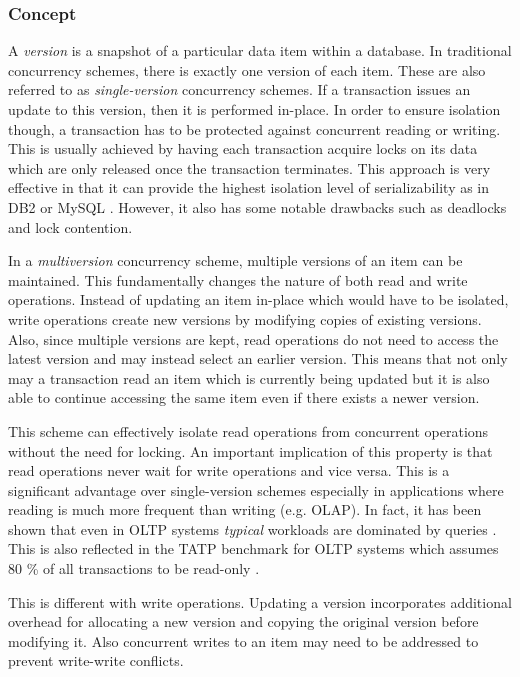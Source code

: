\subsubsection{Concept}

A \emph{version} is a snapshot of a particular data item within a database. In
traditional concurrency schemes, there is exactly one version of each item.
These are also referred to as \emph{single-version} concurrency schemes. If a
transaction issues an update to this version, then it is performed in-place. In
order to ensure isolation though, a transaction has to be protected against
concurrent reading or writing. This is usually achieved by having each
transaction acquire locks on its data which are only released once the
transaction terminates. This approach is very effective in that it can provide
the highest isolation level of serializability as in DB2 or MySQL
\cite{berenson1995critique}. However, it also has some notable drawbacks such as
deadlocks and lock contention.

In a \emph{multiversion} concurrency scheme, multiple versions of an item can be
maintained. This fundamentally changes the nature of both read and write
operations. Instead of updating an item in-place which would have to be
isolated, write operations create new versions by modifying copies of existing
versions. Also, since multiple versions are kept, read operations do not need to
access the latest version and may instead select an earlier version. This means
that not only may a transaction read an item which is currently being updated
but it is also able to continue accessing the same item even if there exists a
newer version.

This scheme can effectively isolate read operations from concurrent operations
without the need for locking. An important implication of this property is that
read operations never wait for write operations and vice versa. This is a
significant advantage over single-version schemes especially in applications
where reading is much more frequent than writing (e.g. OLAP). In fact, it has
been shown that even in OLTP systems \emph{typical} workloads are dominated by
queries \cite{krueger2011fast, andrei2017sap}. This is also reflected in the
TATP benchmark for OLTP systems which assumes 80 \% of all transactions to be
read-only \cite{larson2011high, neumann2015fast, oukid2015instant}.

This is different with write operations. Updating a version incorporates
additional overhead for allocating a new version and copying the original
version before modifying it. Also concurrent writes to an item may need to be
addressed to prevent write-write conflicts.

